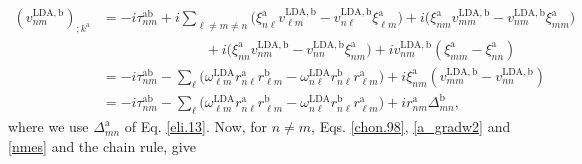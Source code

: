 \begin{align}\label{nmes}
(v^{\mathrm{LDA},\mathrm{b}}_{nm})_{;k^{\mathrm{a}}}&=
-i\tau^{\mathrm{a}\mathrm{b}}_{nm}
+i  
\sum_{\ell\ne m\ne n}
\bigg(
\xi^{\mathrm{a}}_{n\ell}  
v^{\mathrm{LDA},\mathrm{b}}_{\ell m}
-  
v^{\mathrm{LDA},\mathrm{b}}_{n\ell}
\xi^{\mathrm{a}}_{\ell m}
\bigg)  
+i  
\bigg(
\xi^{\mathrm{a}}_{nm}  
v^{\mathrm{LDA},\mathrm{b}}_{mm}
-  
v^{\mathrm{LDA},\mathrm{b}}_{nm}
\xi^{\mathrm{a}}_{mm}
\bigg)  
\nonumber\\
&\qquad\qquad\qquad\quad\,\,+  
i  
\bigg(
\xi^{\mathrm{a}}_{nn}  
v^{\mathrm{LDA},\mathrm{b}}_{nm}
-  
v^{\mathrm{LDA},\mathrm{b}}_{nn}
\xi^{\mathrm{a}}_{nm}
\bigg)  
+i   
v^{\mathrm{LDA},\mathrm{b}}_{nm}(\xi^{\mathrm{a}}_{mm}
-
\xi^{\mathrm{a}}_{nn}
)  
\nonumber \\
&=
-i\tau^{\mathrm{a}\mathrm{b}}_{nm}
-
\sum_{\ell}
\bigg(
\omega^\mathrm{LDA}_{\ell m}  
r^{\mathrm{a}}_{n\ell}  
r^{\mathrm{b}}_{\ell m}
-
\omega^\mathrm{LDA}_{n\ell}  
r^{\mathrm{b}}_{n\ell}  
r^{\mathrm{a}}_{\ell m}
\bigg)  
+i  
\xi^{\mathrm{a}}_{nm}
(v^{\mathrm{LDA},\mathrm{b}}_{mm}
-  
v^{\mathrm{LDA},\mathrm{b}}_{nn}
)  
\nonumber \\
&=
-i\tau^{\mathrm{a}\mathrm{b}}_{nm}
-
\sum_{\ell}
\bigg(
\omega^\mathrm{LDA}_{\ell m}   
r^{\mathrm{a}}_{n\ell}   
r^{\mathrm{b}}_{\ell m}
-
\omega^\mathrm{LDA}_{n\ell}   
r^{\mathrm{b}}_{n\ell}   
r^{\mathrm{a}}_{\ell m}
\bigg)  
+i   
r^{\mathrm{a}}_{nm}
\Delta^{\mathrm{b}}_{mn}
,
\end{align}   
where we use $\Delta^\mathrm{a}_{mn}$ of Eq. \eqref{eli.13}.
Now, for $n \ne m$, Eqs. \eqref{chon.98},
 \eqref{a_gradw2} and 
 \eqref{nmes} and the chain rule, give
